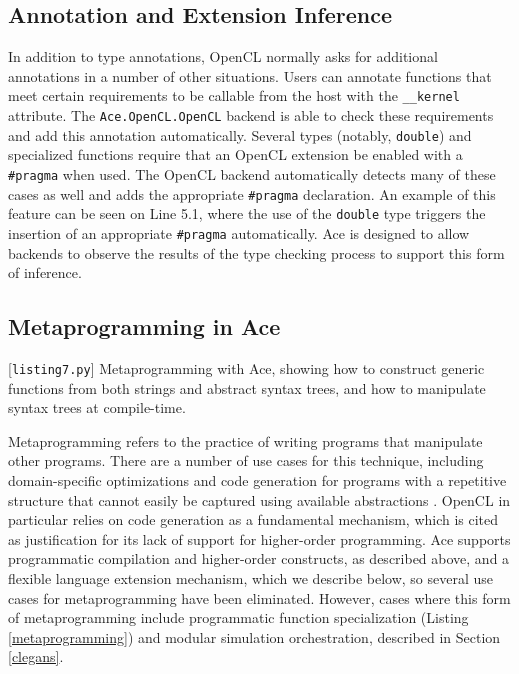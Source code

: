 \documentclass{sig-alternate}
\begin{document}
\subsection{Annotation and Extension Inference}
In addition to type annotations, OpenCL normally asks for additional annotations in a number of other situations.  Users can annotate functions that meet certain requirements to be callable from the host with the \verb|__kernel| attribute. The \verb|Ace.OpenCL.OpenCL| backend is able to check these requirements and add this annotation automatically. Several types (notably, \verb|double|) and specialized functions require that an OpenCL extension be enabled with a \verb|#pragma| when used. The OpenCL backend automatically detects many of these cases as well and adds the appropriate \verb|#pragma| declaration. An example of this feature can be seen on Line 5.1, where the use of the \verb|double| type triggers the insertion of an appropriate \verb|#pragma| automatically. Ace is designed to allow backends to observe the results of the type checking process to support this form of inference.

\subsection{Metaprogramming in Ace}
\begin{codelisting}

\caption{[\texttt{listing7.py}] Metaprogramming with Ace, showing how to construct generic functions from both strings and abstract syntax trees, and how to manipulate syntax trees at compile-time.}
\label{metaprogramming}
\end{codelisting}
Metaprogramming refers to the practice of writing programs that manipulate other programs. There are a number of use cases for this technique, including domain-specific optimizations and code generation for programs with a repetitive structure that cannot easily be captured using available abstractions \cite{pyopencl}. OpenCL in particular relies on code generation as a fundamental mechanism, which is cited as justification for its lack of support for higher-order programming. Ace supports programmatic compilation and higher-order constructs, as described above, and a flexible language extension mechanism, which we describe below, so several use cases for metaprogramming have been eliminated. However, cases where this form of metaprogramming include programmatic function specialization (Listing \ref{metaprogramming}) and modular simulation orchestration, described in Section \ref{clegans}.
\end{document}
